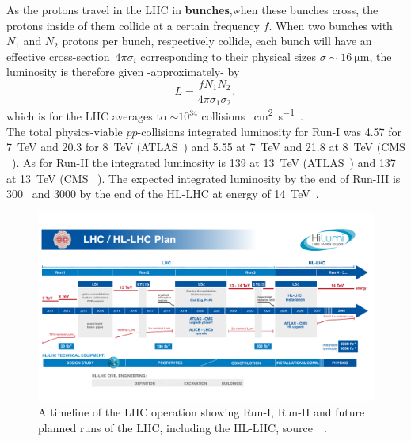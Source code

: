 As the protons travel in the LHC in \textbf{bunches},when these bunches cross, the protons inside of them collide at a certain frequency $f$.  When two bunches with $N_1$ and $N_2$ protons per bunch, respectively collide, each bunch will have an effective cross-section~$4 \pi \sigma_i$ corresponding to their physical sizes $\sigma \sim \SI{16}{\micro \meter}$, the luminosity is therefore given -approximately- by 
\begin{equation}
	L = \frac{f N_1 N_2}{4 \pi  \sigma_1 \sigma_2},
\end{equation}
which is for the LHC averages to  $\sim 10^{34}$ collisions \si{\per \centi\metre\squared \per \second}~\cite{closer,lhcpreformance}.  \\ The total physics-viable $pp$-collisions  integrated luminosity for Run-I was \SI{4.57}{\infb} for \SI{7}{\tera\electronvolt} and \SI{20.3}{\infb} for \SI{8}{\tera\electronvolt} (ATLAS~\cite{atlaslumi1}) and  \SI{5.55}{\infb} at \SI{7}{\tera\electronvolt} and \SI{21.8}{\infb} at \SI{8}{\tera\electronvolt} (CMS ~\cite{cmslumi}). As for Run-II the integrated luminosity is \SI{139}{\infb} at \SI{13}{\tera\electronvolt } (ATLAS~\cite{atlaslumi2})  and \SI{137}{\infb} at \SI{13}{\tera\electronvolt } (CMS ~\cite{cmslumi}). The expected integrated luminosity by the end of Run-III is  \SI{300}{\infb}~\cite{Fartoukh:2790409} and \SI{3000}{\infb} by the end of the HL-LHC at energy of \SI{14}{\tera\electronvolt }~\cite{Apollinari:2015bam}. 
\begin{figure}[htbp!]
	\centering
		\includegraphics[width=\textwidth]{figures/HL-LHC-plan-2021-1}
	\caption{ A timeline of the LHC operation showing Run-I, Run-II and future planned runs of the LHC, including the HL-LHC, source~~\cite{lhckomission}. 
	}
\label{fig:lhcplan}
\end{figure}
